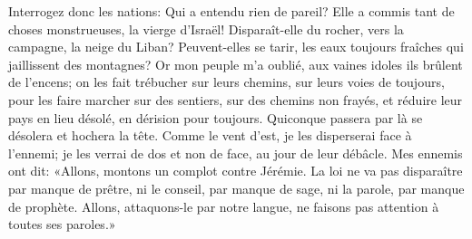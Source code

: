 Interrogez donc les nations: Qui a entendu rien de pareil?
	Elle a commis tant de choses monstrueuses, la vierge d’Israël!
Disparaît-elle du rocher, vers la campagne, la neige du Liban?
	Peuvent-elles se tarir, les eaux toujours fraîches qui jaillissent des montagnes?
Or mon peuple m’a oublié, aux vaines idoles ils brûlent de l’encens;
	on les fait trébucher sur leurs chemins, sur leurs voies de toujours,
	pour les faire marcher sur des sentiers, sur des chemins non frayés,
	et réduire leur pays en lieu désolé, en dérision pour toujours.
Quiconque passera par là se désolera et hochera la tête.
Comme le vent d’est, je les disperserai face à l’ennemi;
	je les verrai de dos et non de face, au jour de leur débâcle.
Mes ennemis ont dit:
	«Allons, montons un complot contre Jérémie.
	La loi ne va pas disparaître par manque de prêtre,
	ni le conseil, par manque de sage, ni la parole, par manque de prophète.
Allons, attaquons-le par notre langue, ne faisons pas attention à toutes ses paroles.»
